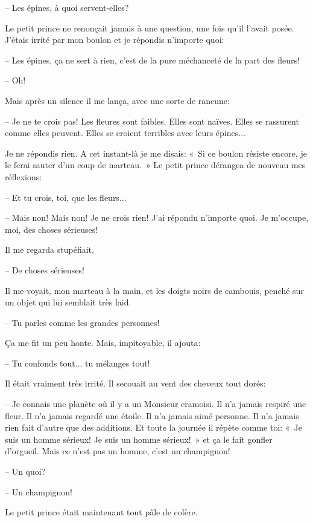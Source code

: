 \documentclass[a4paper]{report}
\begin{document}
-- Les épines, à quoi servent-elles?

Le petit prince ne renonçait jamais à une question, une fois qu'il l'avait posée. J'étais irrité par mon boulon et je répondis n'importe quoi:

-- Les épines, ça ne sert à rien, c'est de la pure méchanceté de la part des fleurs!

-- Oh!

Mais après un silence il me lança, avec une sorte de rancune:

-- Je ne te crois pas! Les fleures sont faibles. Elles sont naïves. Elles se rassurent comme elles peuvent. Elles se croient terribles avec leurs épines...

Je ne répondis rien. A cet instant-là je me disais: «~Si ce boulon résiste encore, je le ferai sauter d'un coup de marteau.~» Le petit prince dérangea de nouveau mes réflexions:

-- Et tu crois, toi, que les fleurs...

-- Mais non! Mais non! Je ne crois rien! J'ai répondu n'importe quoi. Je m'occupe, moi, des choses sérieuses!

Il me regarda stupéfiait.

-- De choses sérieuses!

Il me voyait, mon marteau à la main, et les doigts noirs de cambouis, penché sur un objet qui lui semblait très laid.

-- Tu parles comme les grandes personnes!

Ça me fit un peu honte. Mais, impitoyable, il ajouta:

-- Tu confonds tout... tu mélanges tout!

Il était vraiment très irrité. Il secouait au vent des cheveux tout dorés:

-- Je connais une planète où il y a un Monsieur cramoisi. Il n'a jamais respiré une fleur. Il n'a jamais regardé une étoile. Il n'a jamais aimé personne. Il n'a jamais rien fait d'autre que des additions. Et toute la journée il répète comme toi: «~Je suis un homme sérieux! Je suis un homme sérieux!~» et ça le fait gonfler d'orgueil. Mais ce n'est pas un homme, c'est un champignon! 


-- Un quoi?

-- Un champignon!

Le petit prince était maintenant tout pâle de colère.
\end{document}
